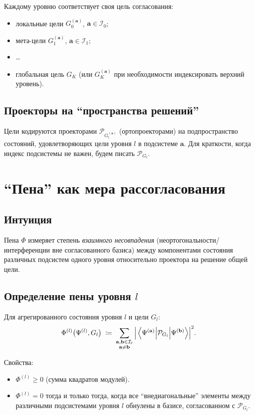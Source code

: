 \documentclass[11pt]{article}
\begin{document}
Каждому уровню соответствует своя цель согласования:
\begin{itemize}[leftmargin=*, itemsep=2pt]
  \item локальные цели $G_0^{(\mathbf{a})}$, $\mathbf{a}\in\mathcal{I}_0$;
  \item мета-цели $G_1^{(\mathbf{a})}$, $\mathbf{a}\in\mathcal{I}_1$;
  \item \dots
  \item глобальная цель $G_K$ (или $G_K^{(\mathbf{a})}$ при необходимости индексировать верхний уровень).
\end{itemize}

\subsection{Проекторы на ``пространства решений''}

Цели кодируются проекторами $\mathcal{P}_{G_l^{(\mathbf{a})}}$ (ортопроекторами) на подпространство состояний, удовлетворяющих цели уровня $l$ в подсистеме $\mathbf{a}$. Для краткости, когда индекс подсистемы не важен, будем писать $\mathcal{P}_{G_l}$.

\section{``Пена'' как мера рассогласования}

\subsection{Интуиция}

Пена $\Phi$ измеряет степень \emph{взаимного несовпадения} (неортогональности/интерференции вне согласованного базиса) между компонентами состояния различных подсистем одного уровня относительно проектора на решение общей цели.

\subsection{Определение пены уровня $l$}

Для агрегированного состояния уровня $l$ и цели $G_l$:
\[
\Phi^{(l)}\bigl(\Psi^{(l)},G_l\bigr)
\;\coloneqq\;
\sum_{\substack{\mathbf{a},\mathbf{b}\in\mathcal{I}_l\\ \mathbf{a}\neq\mathbf{b}}}
\abs{\mel{\Psi^{(\mathbf{a})}}{\mathcal{P}_{G_l}}{\Psi^{(\mathbf{b})}}}^2.
\]

Свойства:
\begin{itemize}[leftmargin=*, itemsep=2pt]
  \item $\Phi^{(l)}\ge 0$ (сумма квадратов модулей).
  \item $\Phi^{(l)}=0$ тогда и только тогда, когда все ``внедиагональные'' элементы между различными подсистемами уровня $l$ обнулены в базисе, согласованном с $\mathcal{P}_{G_l}$.
\end{itemize}
\end{document}

